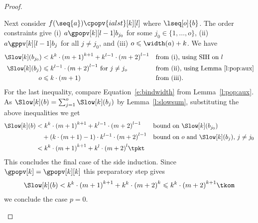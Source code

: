 \documentclass{LMCS}
\begin{document}
\begin{proof}
\begin{description}[leftmargin=0.3cm]
    Next consider $f(\seq{a}) \cpopv{ialst}[k][l]$ where $\lseq[o]{b}$.
    The order constraints give
    (i) $a \gpopv[k][l-1] b_{j_0}$ for some $j_0 \in\{1,\dots,o\}$,
    (ii) $a \gppv[k][l-1] b_j$ for all $j \neq j_0$, and
    (iii) $o \leqslant \width(a) + k$.
    We have 
    \begin{align*}
      \Slow[k](b_{j_0}) & < k^k \cdot {(m+1)}^{k+1} + k^{l-1} \cdot {(m + 2)}^{l-1} && \text{from (i), using SIH on $l$ } \\
      \Slow[k](b_j) & \leqslant k^{l-1} \cdot {(m + 2)}^{l-1}\text{ for $j \not = j_o$} && \text{from (ii), using Lemma~\ref{l:pop:aux}} \\
      o & \leqslant k \cdot (m + 1) && \text{from (iii).}
    \end{align*}
    For the last inequality, compare Equation~\eqref{e:bindwidth} from Lemma~\ref{l:pop:aux}.
    As $\Slow[k](b) = \sum_{j =1}^o \Slow[k](b_j)$ by Lemma~\ref{l:slowsum}, substituting 
    the above inequalities we get
    \begin{align*}
      \Slow[k](b) & <  k^k \cdot {(m+1)}^{k+1} + k^{l-1} \cdot {(m + 2)}^{l-1} && \text{bound on $\Slow[k](b_{j_0})$}\\
      & \quad + (k \cdot (m+1) - 1) \cdot k^{l-1} \cdot {(m + 2)}^{l-1} && \text{bound on $o$ and $\Slow[k](b_{j})$, $j \not=j_0$}\\ 
      & <  k^k \cdot {(m+1)}^{k+1} + k^{l} \cdot {(m + 2)}^{l} \tpkt
    \end{align*}
    This concludes the final case of the side induction.
    Since ${\gpopv[k]} = {\gpopv[k][k]}$ this preparatory step gives
    \begin{align*}
      \Slow[k](b) < k^k \cdot {(m+1)}^{k+1} + k^k \cdot {(m + 2)}^k 
\leqslant k^k \cdot {(m + 2)}^{k+1}\tkom
    \end{align*}
    we conclude the case $p = 0$.

    \medskip


\end{description}
\end{proof}
\end{document}
